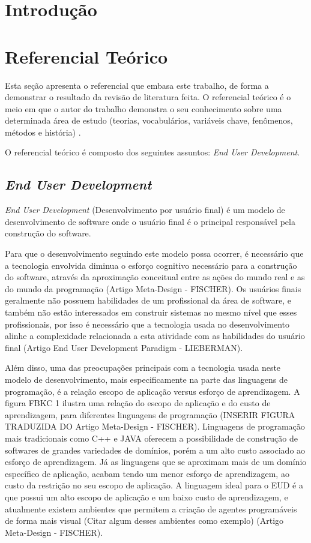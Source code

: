 \chapter[Introdução]{Introdução}

\chapter[Referencial Teórico]{Referencial Teórico}

Esta seção apresenta o referencial que embasa este trabalho, de forma a demonstrar o resultado da revisão de literatura feita. O referencial teórico é o meio em que o autor do trabalho demonstra o seu conhecimento sobre uma determinada área de estudo (teorias, vocabulários, variáveis chave, fenômenos, métodos e história) \cite{randolph2009guide}.

O referencial teórico é composto dos seguintes assuntos: \textit{End User Development}.


\section{\textit{End User Development}}

\textit{End User Development} (Desenvolvimento por usuário final) é um modelo de desenvolvimento de software onde o usuário final é o principal responsável pela construção do software.

Para que o desenvolvimento seguindo este modelo possa ocorrer, é necessário que a tecnologia envolvida diminua o esforço cognitivo necessário para a construção do software, através da aproximação conceitual entre as ações do mundo real e as do mundo da programação (Artigo Meta-Design - FISCHER). Os usuários finais geralmente não possuem habilidades de um profissional da área de software, e também não estão interessados em construir sistemas no mesmo nível que esses profissionais, por isso é necessário que a tecnologia usada no desenvolvimento alinhe a complexidade relacionada a esta atividade com as habilidades do usuário final (Artigo End User Development Paradigm - LIEBERMAN).

Além disso, uma das preocupações principais com a tecnologia usada neste modelo de desenvolvimento, mais especificamente na parte das linguagens de programação, é a relação escopo de aplicação versus esforço de aprendizagem. A figura FBKC 1 ilustra uma relação do escopo de aplicação e do custo de aprendizagem, para diferentes linguagens de programação (INSERIR FIGURA TRADUZIDA DO Artigo Meta-Design - FISCHER). Linguagens de programação mais tradicionais como C++ e JAVA oferecem a possibilidade de construção de softwares de grandes variedades de domínios, porém a um alto custo associado ao esforço de aprendizagem. Já as linguagens que se aproximam mais de um domínio específico de aplicação, acabam tendo um menor esforço de aprendizagem, ao custo da restrição no seu escopo de aplicação. A linguagem ideal para o EUD é a que possui um alto escopo de aplicação e um baixo custo de aprendizagem, e atualmente existem ambientes que permitem a criação de agentes programáveis de forma mais visual (Citar algum desses ambientes como exemplo) (Artigo Meta-Design - FISCHER). 

